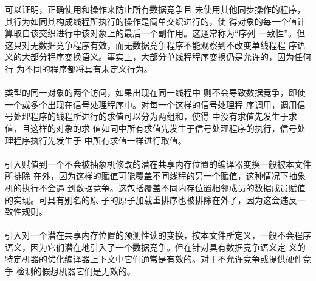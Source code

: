 \begin{note}
  可以证明，正确使用\mtx{}和操作来防止所有数据竞争且
  未使用其他同步操作的程序，其行为如同其构成线程所执行的操作是简单交织进行的，使
  得对象的每一个值计算取自该交织进行中该对象上的最后一个副作用。这通常称为“序列
  一致性”。但这只对无数据竞争程序有效，而无数据竞争程序不能观察到不改变单线程程
  序语义的大部分程序变换语义。事实上，大部分单线程程序变换仍是允许的，因为任何行
  为不同的程序都将具有未定义行为。
\end{note}

\paragraph{} %
类型的同一对象的两个访问，如果出现在同一线程中
则不会导致数据竞争，即使一个或多个出现在信号处理程序中。对每一个这样的信号处理程
序调用，调用信号处理程序的线程所进行的求值可以分为两组和，使得
中没有求值先发生于求值，且这样的对象的求
值如同中所有求值先发生于信号处理程序的执行，信号处理程序执行先发生于
中所有求值一样进行取值。

\paragraph{} %
\begin{note}
  引入赋值到一个不会被抽象机修改的潜在共享内存位置的编译器变换一般被本文件所排除
  在外，因为这样的赋值可能覆盖不同线程的另一个赋值，这种情况下抽象机的执行不会遇
  到数据竞争。这包括覆盖不同内存位置相邻成员的数据成员赋值的实现。可具有别名的原
  子的原子加载重排序也被排除在外了，因为这会违反一致性规则。
\end{note}

\paragraph{} %
\begin{note}
  引入对一个潜在共享内存位置的预测性读的变换，按本文件所定义，一般不会\cpp{}程序
  语义，因为它们潜在地引入了一个数据竞争。但在针对具有数据竞争语义\wellform{}定
  义的特定机器的优化编译器上下文中它们通常是有效的。对于不允许竞争或提供硬件竞争
  检测的假想机器它们是无效的。
\end{note}
